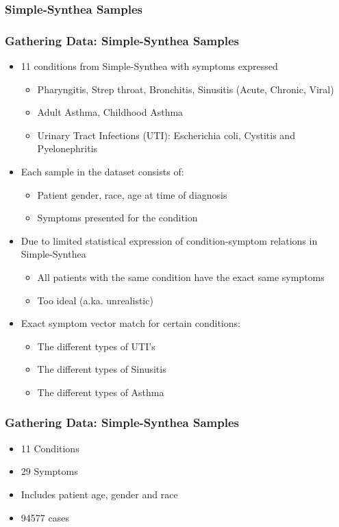\documentclass{beamer}
\begin{document}
	\subsubsection{Simple-Synthea Samples}
		\begin{frame}
		\frametitle{Gathering Data: Simple-Synthea  Samples}
		\begin{itemize}
			\item 11 conditions from Simple-Synthea with symptoms expressed
			\begin{itemize}
				\item Pharyngitis, Strep throat, Bronchitis, Sinusitis (Acute, Chronic, Viral)
				\item Adult Asthma, Childhood Asthma
				\item Urinary Tract Infections (UTI): Escherichia coli, Cystitis and Pyelonephritis
			\end{itemize}
			\item Each sample in the dataset consists of:
				\begin{itemize}
					\item Patient gender, race, age at time of diagnosis
					\item Symptoms presented for the condition
				\end{itemize}
			\item Due to limited statistical expression of condition-symptom relations in Simple-Synthea
				\begin{itemize}
					\item All patients with the same condition have the exact same symptoms
					\item Too ideal (a.ka. unrealistic)
				\end{itemize}
			\item Exact symptom vector match for certain conditions:
			\begin{itemize}
				\item The different types of UTI's
				\item The different types of Sinusitis
				\item The different types of Asthma
			\end{itemize}
		\end{itemize}
		\end{frame}
	
	\begin{frame}
		\frametitle{Gathering Data: Simple-Synthea Samples}
		\begin{itemize}
			\item 11 Conditions
			\item 29 Symptoms
			\item Includes patient age, gender and race
			\item 94577 cases
		\end{itemize}
	\end{frame}
	
\end{document}
